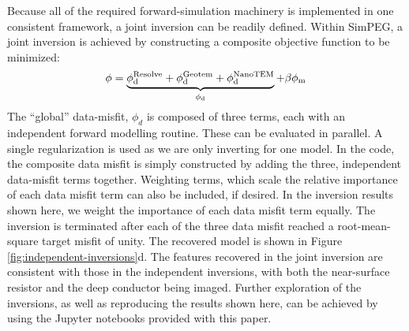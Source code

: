 \documentclass[paper]{geophysics}
\begin{document}
Because all of the required forward-simulation machinery is implemented in one consistent framework, a joint inversion can be readily defined. Within SimPEG, a joint inversion is achieved by constructing a composite objective function to be minimized:
\begin{equation}
\phi = \underbrace{\phi_{\rm d}^{\text{Resolve}} + \phi_{\rm d}^{\text{Geotem}} + \phi_{\rm d}^{\text{NanoTEM}}}_{\phi_{\rm d}} + \beta \phi_{\rm m}
\label{eq:combo-objective}
\end{equation}
The ``global'' data-misfit, $\phi_d$ is composed of three terms, each with an independent forward modelling routine. These can be evaluated in parallel. A single regularization is used as we are only inverting for one model. In the code, the composite data misfit is simply constructed by adding the three, independent data-misfit terms together. Weighting terms, which scale the relative importance of each data misfit term can also be included, if desired. In the inversion results shown here, we weight the importance of each data misfit term equally. The inversion is terminated after each of the three data misfit reached a root-mean-square target misfit of unity.  The recovered model is shown in Figure \ref{fig:independent-inversions}d. The features recovered in the joint inversion are consistent with those in the independent inversions, with both the near-surface resistor and the deep conductor being imaged. Further exploration of the inversions, as well as reproducing the results shown here, can be achieved by using the Jupyter notebooks provided with this paper.
\end{document}
